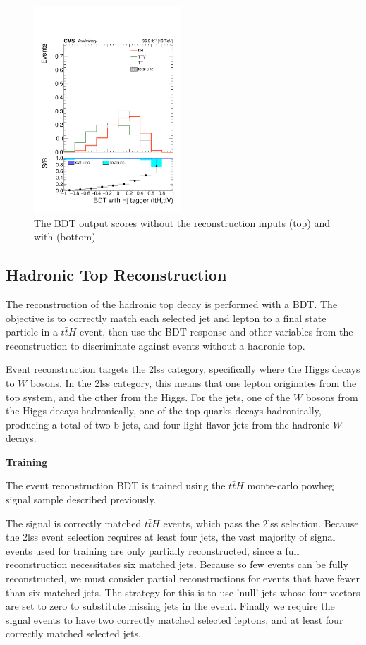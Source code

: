 \begin{figure}[htp]
\includegraphics[width=0.49\textwidth]{ch9_figs/kinMVA_2lss_ttV_withHj.pdf}
\caption[BDT output scores with and without reconstruction inputs]{The BDT output scores without the reconstruction inputs (top) and with (bottom).}
\label{fig:inputs3}
\end{figure}

\subsection{Hadronic Top Reconstruction}
The reconstruction of the hadronic top decay is performed with a BDT. The objective is to correctly match
each selected jet and lepton to a final state particle in a $t\bar{t}H$ event, then
use the BDT response and other variables from the reconstruction to discriminate
against events without a hadronic top.     

Event reconstruction targets the 2lss category, specifically where the Higgs decays
to $W$ bosons. In the 2lss category, this means that one lepton originates from the
top system, and the other from the Higgs. For the jets, one of the
$W$ bosons from the Higgs decays hadronically, one of the top quarks decays
hadronically, producing a total of two b-jets, and four light-flavor jets
from the hadronic $W$ decays.   

{\bfseries Training}

The event reconstruction BDT is trained using the $t\bar{t}H$ monte-carlo powheg
signal sample described previously. 

The signal is correctly matched $t\bar{t}H$ events, which pass the 2lss selection.
Because the 2lss event selection requires at least four jets, the vast majority of signal
events used for training are only partially reconstructed, since a full reconstruction
necessitates six matched jets. Because so few events can be fully reconstructed, we must
consider partial reconstructions for events that have fewer than six matched jets.
The strategy for this is to use 'null' jets whose four-vectors are set to zero to
substitute missing jets in the event. Finally we require the signal events to have two
correctly matched selected leptons, and at least four correctly matched selected jets.

